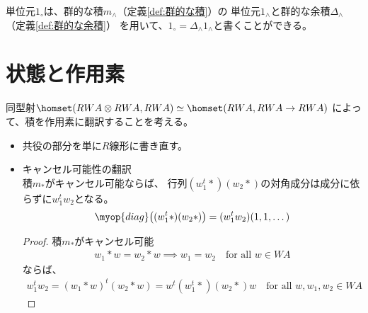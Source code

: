 	単位元$1_\circ$は、群的な積$m_\land$（定義\ref{def:群的な積}）の
	単位元$1_\land$と群的な余積$\Delta_\land$（定義\ref{def:群的な余積}）
	を用いて、$1_\circ=\Delta_\land 1_\land$と書くことができる。

\section{状態と作用素}\label{s1:状態と作用素} %
	同型射$\homset(RWA\otimes RWA,RWA)\simeq\homset(RWA,RWA\to RWA)$
	によって、積を作用素に翻訳することを考える。

	\begin{todo}[修正]\label{todo:修正} %
		\begin{itemize}\setlength{\itemsep}{-1mm} %
			\item 共役の部分を単に$R$線形に書き直す。
			\item キャンセル可能性の翻訳\\
			積$m_*$がキャンセル可能ならば、
			行列$(w_1^t*)(w_2*)$の対角成分は成分に依らずに$w_1^tw_2$となる。
			\begin{equation*}\begin{split} %
				\myop{diag}\bigl((w_1^t*)(w_2*)\bigr)=(w_1^tw_2)(1,1,\dots)
			\end{split}\end{equation*} %
			\begin{proof} %
				積$m_*$がキャンセル可能
				\begin{equation*}\begin{split} %
					w_1*w=w_2*w \implies w_1=w_2 \quad\text{for all }w\in WA
				\end{split}\end{equation*} %
				ならば、
				\begin{equation*}\begin{split} %
					w_1^tw_2 = (w_1*w)^t(w_2*w) = w^t(w_1^t*)(w_2*)w
					\quad\text{for all }w,w_1,w_2\in WA
				\end{split}\end{equation*} %
			\end{proof} %
		\end{itemize} %
	\end{todo} %

